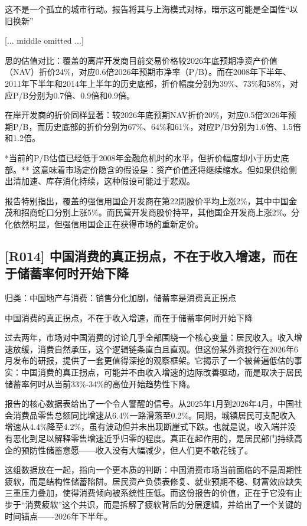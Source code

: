\documentclass[11pt]{ctexart}
\begin{document}
这不是一个孤立的城市行动。报告将其与上海模式对标，暗示这可能是全国性“以旧换新”

[... middle omitted ...]

思的估值对比：覆盖的离岸开发商目前交易价格较2026年底预期净资产价值（NAV）折价24\%，对应0.6倍2026年预期市净率（P/B）。而在2008年下半年、2011年下半年和2014年上半年的历史底部，折价幅度分别为39\%、73\%和58\%，对应P/B分别为0.7倍、0.9倍和0.9倍。

在岸开发商的折价同样显著：较2026年底预期NAV折价20\%，对应0.5倍2026年预期P/B，而历史底部的折价分别为67\%、64\%和61\%，对应P/B分别为1.6倍、1.5倍和1.2倍。

*当前的P/B估值已经低于2008年金融危机时的水平，但折价幅度却小于历史底部。** 这意味着市场定价隐含的假设是：资产价值还将继续缩水。但如果供给侧出清加速、库存消化持续，这种假设可能过于悲观。

报告特别指出，覆盖的强信用国企开发商在第22周股价平均上涨2\%，其中中国金茂和招商蛇口分别上涨5\%。而民营开发商股价持平，其他国企开发商上涨2\%。分化依然明显，但强信用国企正在获得市场的重新定价。

\subsection{[R014] 中国消费的真正拐点，不在于收入增速，而在于储蓄率何时开始下降}
{\small\color{refgray}归类：中国地产与消费：销售分化加剧，储蓄率是消费真正拐点}

中国消费的真正拐点，不在于收入增速，而在于储蓄率何时开始下降

过去两年，市场对中国消费的讨论几乎全部围绕一个核心变量：居民收入。收入增速放缓，消费自然承压，这个逻辑链条直白且直观。但这份某外资投行在2026年6月发布的研报，提供了一套更值得深挖的观察框架。它揭示了一个被普遍低估的事实：中国消费的真正拐点，可能并不由收入增速的边际改善驱动，而是取决于居民储蓄率何时从当前33\%-34\%的高位开始趋势性下降。

报告的核心数据表给出了一个令人警醒的信号。从2025年1月到2026年4月，中国社会消费品零售总额同比增速从6.4\%一路滑落至0.2\%。同期，城镇居民可支配收入增速从4.4\%降至4.2\%，虽有波动但并未出现断崖式下跌。也就是说，收入端并没有恶化到足以解释零售增速近乎归零的程度。真正在起作用的，是居民部门持续高企的预防性储蓄意愿——收入没有大幅减少，但人们更不敢花钱了。

这组数据放在一起，指向一个更本质的判断：中国消费市场当前面临的不是周期性疲软，而是结构性储蓄陷阱。居民资产负债表修复、就业预期不稳、财富效应缺失三重压力叠加，使得消费倾向被系统性压低。而这份报告的价值，正在于它没有止步于“消费疲软”这个共识，而是拆解了疲软背后的分层逻辑，并给出了一个关键的时间锚点——2026年下半年。
\end{document}
